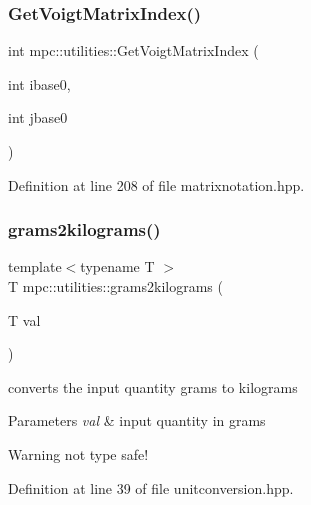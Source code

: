 \subsubsection{\texorpdfstring{Get\+Voigt\+Matrix\+Index()}{GetVoigtMatrixIndex()}}
{\footnotesize\ttfamily int mpc\+::utilities\+::\+Get\+Voigt\+Matrix\+Index (\begin{DoxyParamCaption}\item[{int}]{ibase0,  }\item[{int}]{jbase0 }\end{DoxyParamCaption})\hspace{0.3cm}{\ttfamily [inline]}}



Definition at line 208 of file matrixnotation.\+hpp.

\mbox{\label{namespacempc_1_1utilities_ae61a687e707b0a0e951881d3f56c0e99}} 
\subsubsection{\texorpdfstring{grams2kilograms()}{grams2kilograms()}}
{\footnotesize\ttfamily template$<$typename T $>$ \\
T mpc\+::utilities\+::grams2kilograms (\begin{DoxyParamCaption}\item[{T}]{val }\end{DoxyParamCaption})}



converts the input quantity grams to kilograms 


\begin{DoxyParams}{Parameters}
{\em val} & input quantity in grams\\
\hline
\end{DoxyParams}
\begin{DoxyWarning}{Warning}
not type safe! 
\end{DoxyWarning}


Definition at line 39 of file unitconversion.\+hpp.

\mbox{\label{namespacempc_1_1utilities_aaee66b89101ea36ef03bb9b8d4e7e4f1}} 
